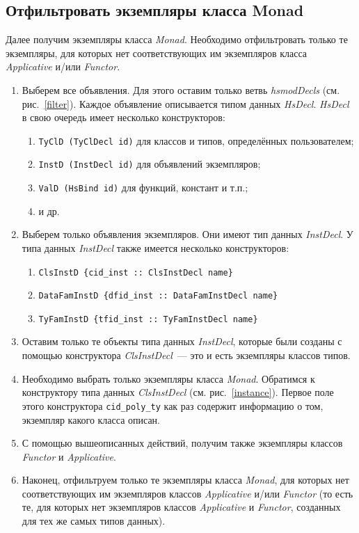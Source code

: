 \subsection{Отфильтровать экземпляры класса Monad}\label{filtermonad}
Далее получим экземпляры класса \textit{Monad}. Необходимо отфильтровать только те экземпляры, для которых нет соответствующих им экземпляров класса \textit{Applicative}  и/или \textit{Functor}.
\begin{enumerate}
\item Выберем все объявления. Для этого оставим только ветвь \textit{hsmodDecls} (см. рис.~\ref{filter}). Каждое объявление описывается типом данных \textit{HsDecl}. \textit{HsDecl} в свою очередь имеет несколько конструкторов:
    \begin{enumerate}[1)]
        \item \lstinline{TyClD (TyClDecl id)} для классов и типов, определённых пользователем;
        \item \lstinline{InstD (InstDecl id)} для объявлений экземпляров;
        \item \lstinline{ValD (HsBind id)} для функций, констант и т.п.;
        \item и др.
    \end{enumerate}
\item Выберем только объявления экземпляров. Они имеют тип данных \textit{InstDecl}. У типа данных \textit{InstDecl} также имеется несколько конструкторов:
    \begin{enumerate}[1)]
        \item \lstinline!ClsInstD {cid_inst :: ClsInstDecl name}!
        \item 
        \lstinline!DataFamInstD {dfid_inst :: DataFamInstDecl name}! 
        
        \item \lstinline!TyFamInstD {tfid_inst :: TyFamInstDecl name}!
    \end{enumerate}
\item Оставим только те объекты типа данных \textit{InstDecl}, которые были созданы с помощью конструктора \textit{ClsInstDecl}~--- это и есть экземпляры классов типов.
\item Необходимо выбрать только экземпляры класса \textit{Monad}. Обратимся к конструктору типа данных \textit{ClsInstDecl} (см. рис.~\ref{instance}). Первое поле этого конструктора \lstinline{cid_poly_ty} как раз содержит информацию о том, экземпляр какого класса описан. 
\item С помощью вышеописанных действий, получим также экземпляры классов \textit{Functor} и \textit{Applicative}.
\item Наконец, отфильтруем только те экземпляры класса \textit{Monad}, для которых нет соответствующих им экземпляров классов \textit{Applicative} и/или \textit{Functor} (то есть те, для которых нет экземпляров классов \textit{Applicative} и \textit{Functor}, созданных для тех же самых типов данных).
\end{enumerate}

